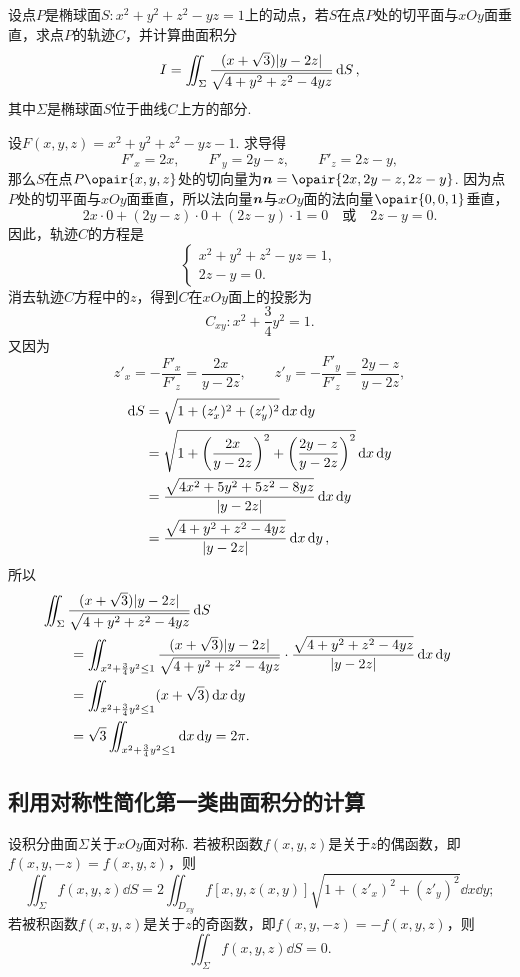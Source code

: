 \begin{example}
设点\(P\)是椭球面\(S: x^2 + y^2 + z^2 - yz = 1\)上的动点，若\(S\)在点\(P\)处的切平面与\(xOy\)面垂直，求点\(P\)的轨迹\(C\)，并计算曲面积分\[
I = \iint_{\Sigma} \frac{(x+\sqrt{3}) \abs{y-2z}}{\sqrt{4+y^2+z^2-4yz}} \dd{S},
\]其中\(\Sigma\)是椭球面\(S\)位于曲线\(C\)上方的部分.
\begin{solution}
设\(F(x,y,z) = x^2 + y^2 + z^2 - yz - 1\).
求导得\[
F'_x = 2x, \qquad
F'_y = 2y - z, \qquad
F'_z = 2z - y,
\]那么\(S\)在点\(P\opair{x,y,z}\)处的切向量为\(\mat{n} = \opair{2x,2y-z,2z-y}\).
因为点\(P\)处的切平面与\(xOy\)面垂直，所以法向量\(\boldsymbol{n}\)与\(xOy\)面的法向量\(\opair{0,0,1}\)垂直，\[
2x\cdot0 + (2y-z)\cdot0+(2z-y)\cdot1=0
\quad\text{或}\quad
2z-y=0.
\]因此，轨迹\(C\)的方程是\[
\begin{cases}
x^2 + y^2 + z^2 - yz = 1, \\
2z-y=0.
\end{cases}
\]消去轨迹\(C\)方程中的\(z\)，得到\(C\)在\(xOy\)面上的投影为\[
C_{xy}: x^2+\frac{3}{4}y^2=1.
\]又因为\[
z'_x = - \frac{F'_x}{F'_z} = \frac{2x}{y-2z}, \qquad
z'_y = - \frac{F'_y}{F'_z} = \frac{2y-z}{y-2z},
\]\begin{align*}
\dd{S} &= \sqrt{1+(z'_x)^2+(z'_y)^2} \dd{x}\dd{y} \\
&= \sqrt{1+\left(\frac{2x}{y-2z}\right)^2+\left(\frac{2y-z}{y-2z}\right)^2} \dd{x}\dd{y} \\
&= \frac{\sqrt{4x^2+5y^2+5z^2-8yz}}{\abs{y-2z}} \dd{x}\dd{y} \\
&= \frac{\sqrt{4+y^2+z^2-4yz}}{\abs{y-2z}} \dd{x}\dd{y},
\end{align*}所以\begin{align*}
&\hspace{-20pt}
\iint_{\Sigma} \frac{(x+\sqrt{3}) \abs{y-2z}}{\sqrt{4+y^2+z^2-4yz}} \dd{S} \\
&= \iint_{x^2+\frac{3}{4}y^2\leq1} \frac{(x+\sqrt{3}) \abs{y-2z}}{\sqrt{4+y^2+z^2-4yz}} \cdot \frac{\sqrt{4+y^2+z^2-4yz}}{\abs{y-2z}} \dd{x}\dd{y} \\
&= \iint_{x^2+\frac{3}{4}y^2\leq1} (x+\sqrt{3}) \dd{x}\dd{y} \\
&= \sqrt{3} \iint_{x^2+\frac{3}{4}y^2\leq1} \dd{x}\dd{y}
= 2\pi.
\end{align*}
\end{solution}
\end{example}

\subsection{利用对称性简化第一类曲面积分的计算}
设积分曲面\(\Sigma\)关于\(xOy\)面对称.
若被积函数\(f(x,y,z)\)是关于\(z\)的偶函数，即\(f(x,y,-z) = f(x,y,z)\)，则\[
\iint_{\Sigma} f(x,y,z) \dd{S} = 2 \iint_{D_{xy}} f[x,y,z(x,y)] \sqrt{1+(z'_x)^2+(z'_y)^2} \dd{x}\dd{y};
\]若被积函数\(f(x,y,z)\)是关于\(z\)的奇函数，即\(f(x,y,-z) = -f(x,y,z)\)，则\[
\iint_{\Sigma} f(x,y,z) \dd{S} = 0.
\]


